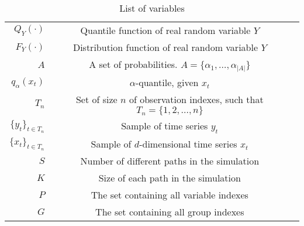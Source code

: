 \begin{table}[htbp]\caption*{List of variables}
\begin{center}%
\begin{tabular}{r c p{10cm} }
\toprule
$Q_Y(\cdot)$ & Quantile function of real random variable $Y$ \\
$F_Y(\cdot)$ & Distribution function of real random variable $Y$ \\
$A$ & A set of probabilities. $A = \{\alpha_1, \dots, \alpha_{|A|} \}$\\
$q_\alpha(x_t)$ & $\alpha$-quantile, given $x_t$ \\
$T_n$ & Set of size $n$ of observation indexes, such that $T_n = \{1, 2, \dots, n\}$ \\
$\{y_t\}_{t \in T_n}$ & Sample of time series $y_t$  \\
$\{x_t\}_{t \in T_n}$ & Sample of $d$-dimensional time series $x_t$  \\
$S$ & Number of different paths in the simulation \\
$K$ & Size of each path in the simulation \\
$P$ & The set containing all variable indexes \\
$G$ & The set containing all group indexes \\


\bottomrule
\end{tabular}
\end{center}
\label{tab:TableOfNotationForMyResearch}
\end{table}
